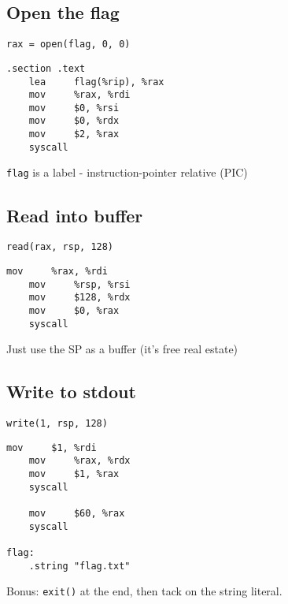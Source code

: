 \documentclass{beamer}
\begin{document}
\subsection{Open the flag}

\begin{frame}[fragile]
    {\tt rax = open(flag, 0, 0) }
    
    \begin{lstlisting}[firstnumber=1]
.section .text
    lea     flag(%rip), %rax
    mov     %rax, %rdi
    mov     $0, %rsi
    mov     $0, %rdx
    mov     $2, %rax
    syscall
    \end{lstlisting}
    
    
    {\tt flag} is a label - instruction-pointer relative (PIC)
\end{frame}

\subsection{Read into buffer}


\begin{frame}[fragile]
    {\tt read(rax, rsp, 128)}

    \begin{lstlisting}[firstnumber=9]
    mov     %rax, %rdi
    mov     %rsp, %rsi
    mov     $128, %rdx
    mov     $0, %rax
    syscall
    \end{lstlisting}

Just use the SP as a buffer (it's free real estate)
\end{frame}

\subsection{Write to stdout}
\begin{frame}[fragile]
    {\tt write(1, rsp, 128)}
    
    \begin{lstlisting}[firstnumber= 15]
    mov     $1, %rdi
    mov     %rax, %rdx
    mov     $1, %rax
    syscall

    mov     $60, %rax
    syscall
    
flag:
    .string "flag.txt"

    \end{lstlisting}
    
    Bonus: {\tt exit()} at the end, then tack on the 
    string literal.

\end{frame}
\end{document}
